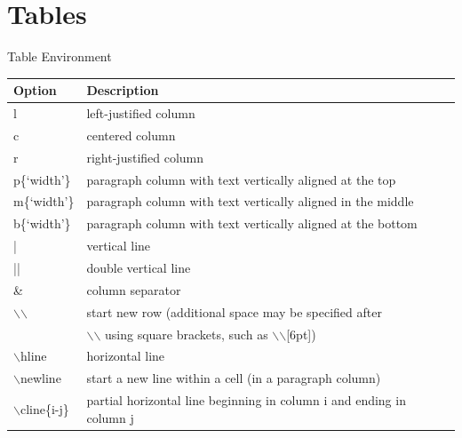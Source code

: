\documentclass[10pt,times]{beamer}
\begin{document}
\section{Tables}
\begin{frame}{Table Environment}

\begin{table}
\begin{tabular}{ll} \hline
\textbf{Option} & \textbf{Description} \\ \hline
l  &	left-justified column \\
c  &	centered column  \\
r  &	right-justified column  \\
p\{`width'\} &	paragraph column with text vertically aligned at the top  \\
m\{`width'\} & 	paragraph column with text vertically aligned in the middle \\
b\{`width'\} &	paragraph column with text vertically aligned at the bottom  \\
| &	vertical line   \\
|| &	double vertical line  \\
\& & 	column separator \\
$\backslash$$\backslash$ &	start new row (additional space may be specified after \\[6pt] & $\backslash$$\backslash$ using square brackets, \newline such as $\backslash$$\backslash$[6pt]) \\
$\backslash$hline &	horizontal line \\
$\backslash$newline & 	start a new line within a cell (in a paragraph column) \\
$\backslash$cline\{i-j\} & 	partial horizontal line beginning in column i and ending in column j \\ \hline
\end{tabular}
\end{table}
\end{frame}
\end{document}
